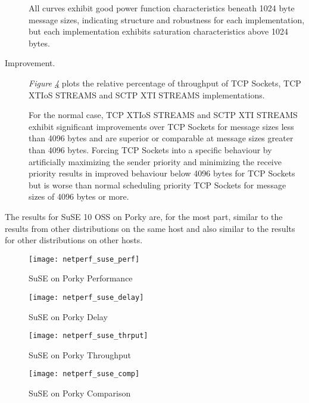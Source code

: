 \documentclass[letterpaper,final,notitlepage,twocolumn,10pt,twoside]{article}
\begin{document}
\begin{description}
All curves exhibit good power function characteristics beneath 1024 byte message sizes, indicating
structure and robustness for each implementation, but each implementation exhibits saturation
characteristics above 1024 bytes.

\item[Improvement.]

\textit{Figure \ref{figure:susecomp}}
plots the relative percentage of throughput of TCP Sockets, TCP XTIoS STREAMS and SCTP XTI STREAMS
implementations.

For the normal case, TCP XTIoS STREAMS and SCTP XTI STREAMS exhibit significant improvements over
TCP Sockets for message sizes less than 4096 bytes and are superior or comparable  at message sizes
greater than 4096 bytes.  Forcing TCP Sockets into a specific behaviour by artificially maximizing
the sender priority and minimizing the receive priority results in improved behaviour below 4096
bytes for TCP Sockets but is worse than normal scheduling priority TCP Sockets for message sizes of
4096 bytes or more.

\end{description}

The results for SuSE 10 OSS on Porky are, for the most part, similar to the results from other
distributions on the same host and also similar to the results for other distributions on other
hosts.

\begin{figure}[p]
\center\texttt{[image: netperf\_suse\_perf]}
\caption[SuSE on Porky Performance]{SuSE on Porky Performance}
\label{figure:suseperf}
\end{figure}

\begin{figure}[p]
\center\texttt{[image: netperf\_suse\_delay]}
\caption[SuSE on Porky Delay]{SuSE on Porky Delay}
\label{figure:susedly}
\end{figure}

\begin{figure}[p]
\center\texttt{[image: netperf\_suse\_thrput]}
\caption[SuSE on Porky Throughput]{SuSE on Porky Throughput}
\label{figure:susethrput}
\end{figure}

\begin{figure}[pt]
\center\texttt{[image: netperf\_suse\_comp]}
\caption[SuSE on Porky Comparison]{SuSE on Porky Comparison}
\label{figure:susecomp}
\end{figure}
\end{document}
